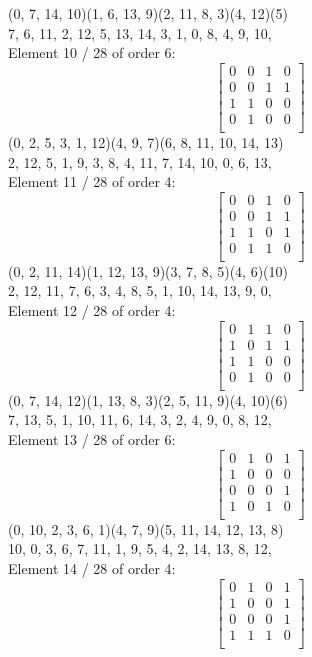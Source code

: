 (0, 7, 14, 10)(1, 6, 13, 9)(2, 11, 8, 3)(4, 12)(5)\\
7, 6, 11, 2, 12, 5, 13, 14, 3, 1, 0, 8, 4, 9, 10, \\
Element    10 / 28 of order 6:
$$
\left[
\begin{array}{*{4}{r}}
0 & 0 & 1 & 0\\
0 & 0 & 1 & 1\\
1 & 1 & 0 & 0\\
0 & 1 & 0 & 0\\
\end{array}
\right]
$$
(0, 2, 5, 3, 1, 12)(4, 9, 7)(6, 8, 11, 10, 14, 13)\\
2, 12, 5, 1, 9, 3, 8, 4, 11, 7, 14, 10, 0, 6, 13, \\
Element    11 / 28 of order 4:
$$
\left[
\begin{array}{*{4}{r}}
0 & 0 & 1 & 0\\
0 & 0 & 1 & 1\\
1 & 1 & 0 & 1\\
0 & 1 & 1 & 0\\
\end{array}
\right]
$$
(0, 2, 11, 14)(1, 12, 13, 9)(3, 7, 8, 5)(4, 6)(10)\\
2, 12, 11, 7, 6, 3, 4, 8, 5, 1, 10, 14, 13, 9, 0, \\
Element    12 / 28 of order 4:
$$
\left[
\begin{array}{*{4}{r}}
0 & 1 & 1 & 0\\
1 & 0 & 1 & 1\\
1 & 1 & 0 & 0\\
0 & 1 & 0 & 0\\
\end{array}
\right]
$$
(0, 7, 14, 12)(1, 13, 8, 3)(2, 5, 11, 9)(4, 10)(6)\\
7, 13, 5, 1, 10, 11, 6, 14, 3, 2, 4, 9, 0, 8, 12, \\
Element    13 / 28 of order 6:
$$
\left[
\begin{array}{*{4}{r}}
0 & 1 & 0 & 1\\
1 & 0 & 0 & 0\\
0 & 0 & 0 & 1\\
1 & 0 & 1 & 0\\
\end{array}
\right]
$$
(0, 10, 2, 3, 6, 1)(4, 7, 9)(5, 11, 14, 12, 13, 8)\\
10, 0, 3, 6, 7, 11, 1, 9, 5, 4, 2, 14, 13, 8, 12, \\
Element    14 / 28 of order 4:
$$
\left[
\begin{array}{*{4}{r}}
0 & 1 & 0 & 1\\
1 & 0 & 0 & 1\\
0 & 0 & 0 & 1\\
1 & 1 & 1 & 0\\
\end{array}
\right]
$$
